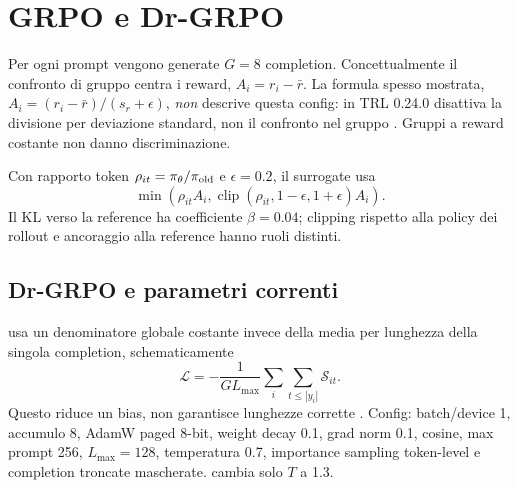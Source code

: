 \chapter{GRPO e Dr-GRPO}\label{chap:grpo}
Per ogni prompt vengono generate $G=8$ completion. Concettualmente il confronto
di gruppo centra i reward, $A_i=r_i-\bar r$. La formula spesso mostrata,
$A_i=(r_i-\bar r)/(s_r+\epsilon)$, \emph{non} descrive questa config: in TRL
0.24.0  disattiva la divisione per deviazione
standard, non il confronto nel gruppo \cite{trlgrpo,shao2024deepseekmath}.
Gruppi a reward costante non danno discriminazione.

Con rapporto token $\rho_{it}=\pi_\theta/\pi_{\rm old}$ e $\epsilon=0.2$, il
surrogate usa
\begin{equation}\min(\rho_{it}A_i,\operatorname{clip}(\rho_{it},1-\epsilon,1+\epsilon)A_i).
\end{equation}
Il KL verso la reference ha coefficiente $\beta=0.04$; clipping rispetto alla
policy dei rollout e ancoraggio alla reference hanno ruoli distinti.

\section{Dr-GRPO e parametri correnti}
 usa un denominatore globale costante invece della
media per lunghezza della singola completion, schematicamente
\begin{equation}\mathcal L=-\frac{1}{G L_{\max}}\sum_i\sum_{t\le |y_i|}\mathcal S_{it}.
\end{equation}
Questo riduce un bias, non garantisce lunghezze corrette \cite{liu2025drgrpo}.
Config: batch/device 1, accumulo 8, AdamW paged 8-bit, weight decay 0.1, grad norm
0.1, cosine, max prompt 256, $L_{\max}=128$, temperatura 0.7, importance sampling
token-level e completion troncate mascherate.  cambia solo $T$ a 1.3.
